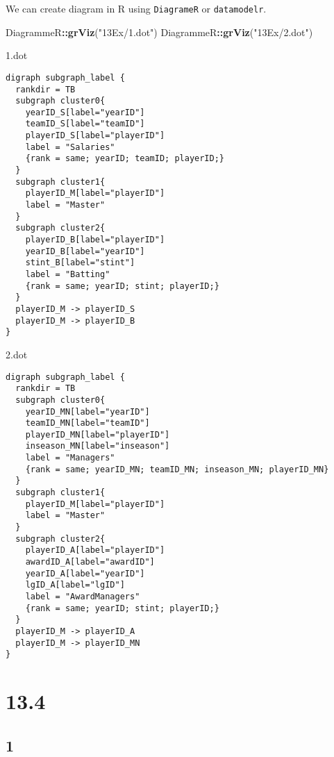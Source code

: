 \documentclass[]{ltjsarticle}
\newenvironment{Shaded}{\begin{snugshade}}{\end{snugshade}}
\newcommand{\KeywordTok}[1]{\textcolor[rgb]{0.13,0.29,0.53}{\textbf{#1}}}
\newcommand{\NormalTok}[1]{#1}
\newcommand{\OperatorTok}[1]{\textcolor[rgb]{0.81,0.36,0.00}{\textbf{#1}}}
\newcommand{\StringTok}[1]{\textcolor[rgb]{0.31,0.60,0.02}{#1}}
\begin{document}
We can create diagram in R using \texttt{DiagrameR} or
\texttt{datamodelr}.

\begin{Shaded}
\begin{Highlighting}[]
\NormalTok{DiagrammeR}\OperatorTok{::}\KeywordTok{grViz}\NormalTok{(}\StringTok{"13Ex/1.dot"}\NormalTok{)}
\NormalTok{DiagrammeR}\OperatorTok{::}\KeywordTok{grViz}\NormalTok{(}\StringTok{"13Ex/2.dot"}\NormalTok{)}
\end{Highlighting}
\end{Shaded}

1.dot

\begin{verbatim}
digraph subgraph_label {
  rankdir = TB
  subgraph cluster0{
    yearID_S[label="yearID"]
    teamID_S[label="teamID"]
    playerID_S[label="playerID"]
    label = "Salaries"
    {rank = same; yearID; teamID; playerID;}
  }
  subgraph cluster1{
    playerID_M[label="playerID"]
    label = "Master"
  }
  subgraph cluster2{
    playerID_B[label="playerID"]
    yearID_B[label="yearID"]
    stint_B[label="stint"]
    label = "Batting"
    {rank = same; yearID; stint; playerID;}
  }
  playerID_M -> playerID_S
  playerID_M -> playerID_B
}
\end{verbatim}

2.dot

\begin{verbatim}
digraph subgraph_label {
  rankdir = TB
  subgraph cluster0{
    yearID_MN[label="yearID"]
    teamID_MN[label="teamID"]
    playerID_MN[label="playerID"]
    inseason_MN[label="inseason"]
    label = "Managers"
    {rank = same; yearID_MN; teamID_MN; inseason_MN; playerID_MN}
  }
  subgraph cluster1{
    playerID_M[label="playerID"]
    label = "Master"
  }
  subgraph cluster2{
    playerID_A[label="playerID"]
    awardID_A[label="awardID"]
    yearID_A[label="yearID"]
    lgID_A[label="lgID"]
    label = "AwardManagers"
    {rank = same; yearID; stint; playerID;}
  }
  playerID_M -> playerID_A
  playerID_M -> playerID_MN
}
\end{verbatim}

\hypertarget{section-11}{%
\section{13.4}\label{section-11}}

\hypertarget{section-12}{%
\subsection{1}\label{section-12}}
\end{document}
